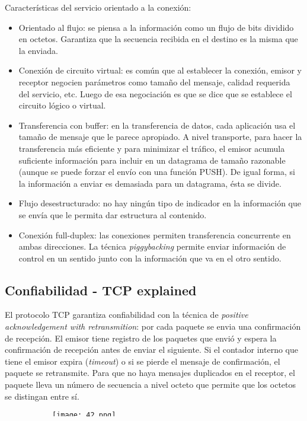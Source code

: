 \documentclass{book}
\begin{document}
	\vspace{3mm}
	Características del servicio orientado a la conexión:
	\begin{itemize}
		\item Orientado al flujo: se piensa a la información como un flujo de bits dividido en octetos. Garantiza que la secuencia recibida en el destino es la misma que la enviada.
		\item Conexión de circuito virtual: es común que al establecer la conexión, emisor y receptor negocien parámetros como tamaño del mensaje, calidad requerida del servicio, etc. Luego de esa negociación es que se dice que se establece el circuito lógico o virtual.
		\item Transferencia con buffer: en la transferencia de datos, cada aplicación usa el tamaño de mensaje que le parece apropiado. A nivel transporte, para hacer la transferencia más eficiente y para minimizar el tráfico, el emisor acumula suficiente información para incluir en un datagrama de tamaño razonable (aunque se puede forzar el envío con una función PUSH). De igual forma, si la información a enviar es demasiada para un datagrama, ésta se divide.
		\item Flujo desestructurado: no hay ningún tipo de indicador en la información que se envía que le permita dar estructura al contenido.
		\item Conexión full-duplex: las conexiones permiten transferencia concurrente en ambas direcciones. La técnica \textit{piggybacking} permite enviar información de control en un sentido junto con la información que va en el otro sentido. 
	\end{itemize}
	
	\subsection{Confiabilidad - TCP explained}
	El protocolo TCP garantiza confiabilidad con la técnica de \textit{positive acknowledgement with retransmition}: por cada paquete se envia una confirmación de recepción. El emisor tiene registro de los paquetes que envió y espera la confirmación de recepción antes de enviar el siguiente. Si el contador interno que tiene el emisor expira (\textit{timeout}) o si se pierde el mensaje de confirmación, el paquete se retransmite. Para que no haya mensajes duplicados en el receptor, el paquete lleva un número de secuencia a nivel octeto que permite que los octetos se distingan entre sí.
	
	\begin{figure}[H]
		\centering
		\begin{subfigure}{0.4\textwidth}
			\centering
			\texttt{[image: 42.png]}
		\end{subfigure}
		\qquad
		\begin{subfigure}{0.4\textwidth}
			\centering
			\texttt{[image: 43.png]}
		\end{subfigure}
	\end{figure}
	
\end{document}
